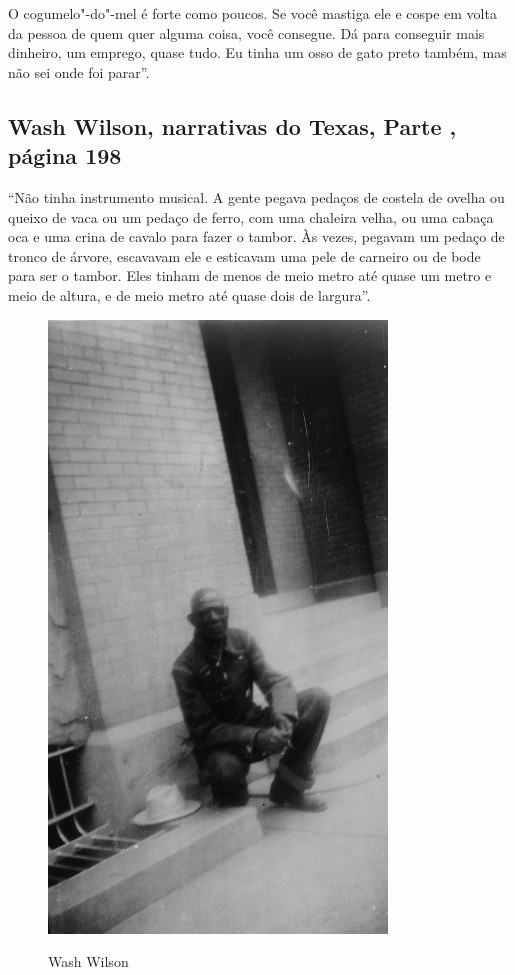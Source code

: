 O cogumelo"-do"-mel é forte como poucos. Se você mastiga ele e cospe em
volta da pessoa de quem quer alguma coisa, você consegue. Dá para
conseguir mais dinheiro, um emprego, quase tudo. Eu tinha um osso de
gato preto também, mas não sei onde foi parar''.

\subsection{Wash Wilson, narrativas do Texas, Parte , página 198}
\label{ref301}

``Não tinha instrumento musical. A gente pegava pedaços de costela de
ovelha ou queixo de vaca ou um pedaço de ferro, com uma chaleira velha,
ou uma cabaça oca e uma crina de cavalo para fazer o tambor. Às vezes,
pegavam um pedaço de tronco de árvore, escavavam ele e esticavam uma
pele de carneiro ou de bode para ser o tambor. Eles tinham de menos de
meio metro até quase um metro e meio de altura, e de meio metro até
quase dois de largura''.

\begin{figure}[]
\centering
 \includegraphics[width=90mm]{./imgs/washwilson_recorte.jpg} \label{img17}
\caption{Wash Wilson}
\end{figure}





